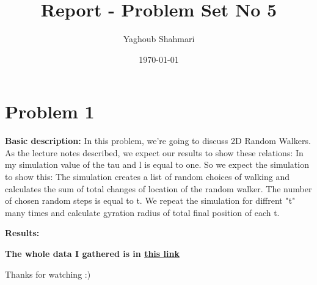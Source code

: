 \documentclass{article}
\author{Yaghoub Shahmari}
\title{Report - Problem Set No 5}
\date{\today}
\begin{document}
    \maketitle
    \section*{Problem 1}
    \textbf{Basic description:}
    In this problem, we're going to discuss 2D Random Walkers. As the lecture notes described, we expect our results to show these relations:
    In my simulation value of the tau and l is equal to one. So we expect the simulation to show this:
    The simulation creates a list of random choices of walking and calculates the sum of total changes of location of the random walker. The number of chosen random steps is equal to t. We repeat the simulation for diffrent "t" many times and calculate gyration radius of total final position of each t.

    \textbf{Results:}


    \pagebreak

    \centering
    \textbf{The whole data I gathered is in \href{https://github.com/shahmari/ComputationalPhysics-Fall2021/tree/main/ProblemSet4/Data}{this link}}
    
    Thanks for watching :)
\end{document}

